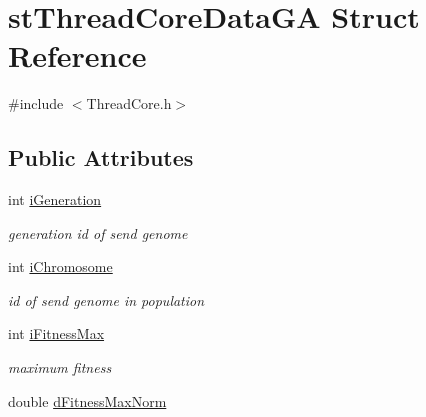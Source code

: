 \hypertarget{structstThreadCoreDataGA}{
\section{stThreadCoreDataGA Struct Reference}
\label{structstThreadCoreDataGA}
}


{\ttfamily \#include $<$ThreadCore.h$>$}\subsection*{Public Attributes}
\begin{DoxyCompactItemize}
\item 
\hypertarget{structstThreadCoreDataGA_a2c9aef5ab4dc5228229775992fdf1c6c}{
int \hyperlink{structstThreadCoreDataGA_a2c9aef5ab4dc5228229775992fdf1c6c}{iGeneration}}
\label{structstThreadCoreDataGA_a2c9aef5ab4dc5228229775992fdf1c6c}

\begin{DoxyCompactList}\small\item\em generation id of send genome \item\end{DoxyCompactList}\item 
\hypertarget{structstThreadCoreDataGA_a08eb470a3a382e7216db9c945a79c0ac}{
int \hyperlink{structstThreadCoreDataGA_a08eb470a3a382e7216db9c945a79c0ac}{iChromosome}}
\label{structstThreadCoreDataGA_a08eb470a3a382e7216db9c945a79c0ac}

\begin{DoxyCompactList}\small\item\em id of send genome in population \item\end{DoxyCompactList}\item 
\hypertarget{structstThreadCoreDataGA_a75bdfb475c9b24402a5f7a8c48673d5a}{
int \hyperlink{structstThreadCoreDataGA_a75bdfb475c9b24402a5f7a8c48673d5a}{iFitnessMax}}
\label{structstThreadCoreDataGA_a75bdfb475c9b24402a5f7a8c48673d5a}

\begin{DoxyCompactList}\small\item\em maximum fitness \item\end{DoxyCompactList}\item 
\hypertarget{structstThreadCoreDataGA_a39e721cf88de72eba935bb8f9312e6b7}{
double \hyperlink{structstThreadCoreDataGA_a39e721cf88de72eba935bb8f9312e6b7}{dFitnessMaxNorm}}
\label{structstThreadCoreDataGA_a39e721cf88de72eba935bb8f9312e6b7}


\end{DoxyCompactItemize}
